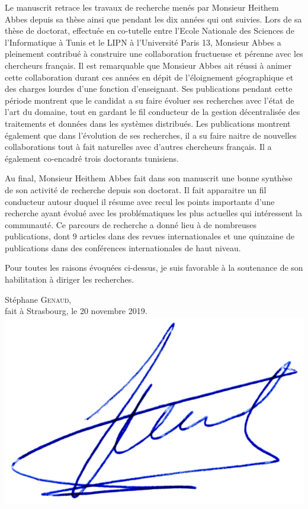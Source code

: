 \documentclass[a4paper,12pt]{article}
\begin{document}
Le manuscrit  retrace les travaux de  recherche menés par Monsieur  Heithem Abbes
depuis sa thèse  ainsi que pendant les  dix années qui ont suivies.   Lors de sa
thèse de doctorat, effectuée en  co-tutelle entre l'Ecole Nationale des Sciences
de l'Informatique à Tunis  et le LIPN à l'Université Paris  13, Monsieur Abbes a
pleinement contribué à  construire une collaboration fructueuse  et pérenne avec
les chercheurs  français.  Il est  remarquable que  Monsieur Abbes ait  réussi à
animer  cette  collaboration  durant  ces   années  en  dépit  de  l'éloignement
géographique  et   des  charges   lourdes  d'une  fonction   d'enseignant.   Ses
publications pendant cette  période montrent que le candidat a  su faire évoluer
ses  recherches  avec  l'état de  l'art  du  domaine,  tout  en gardant  le  fil
conducteur  de la  gestion décentralisée  des  traitements et  données dans  les
systèmes distribués.   Les publications montrent également  que dans l'évolution
de ses recherches, il a su faire  naitre de nouvelles collaborations tout à fait
naturelles avec d'autres  chercheurs français.  Il a  également co-encadré trois
doctorants tunisiens.

Au final,  Monsieur Heithem Abbes fait  dans son manuscrit une  bonne synthèse de
son  activité de  recherche  depuis  son doctorat.  Il  fait  apparaitre un  fil
conducteur  autour duquel  il  résume  avec recul  les  points importants  d'une
recherche  ayant  évolué   avec  les  problématiques  les   plus  actuelles  qui
intéressent la communauté. Ce parcours de recherche a donné lieu à de nombreuses
publications, dont 9 articles dans des revues internationales et une quinzaine de
publications dans des conférences internationales de haut niveau.

Pour toutes les raisons évoquées ci-dessus, je suis favorable à la soutenance de
son habilitation à diriger les recherches.




\vspace{.8cm}
\begin{flushright}
Stéphane \textsc{Genaud},\\
{\small fait à Strasbourg, le 20 novembre 2019}.\\
\includegraphics[width=.20\textwidth]{../signgenaud.jpg}
\end{flushright}
\end{document}
